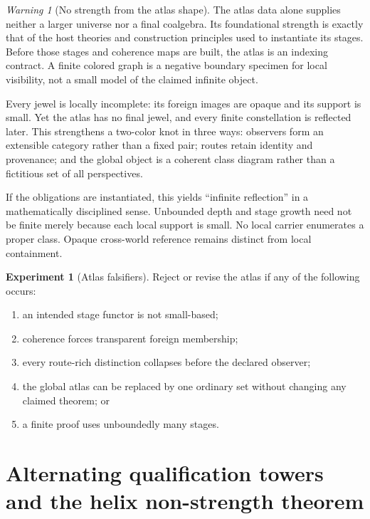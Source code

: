 \documentclass[11pt]{article}
\theoremstyle{definition}
\newtheorem{experiment}[theorem]{Experiment}
\theoremstyle{remark}
\newtheorem{warning}[theorem]{Warning}
\begin{document}
\begin{warning}[No strength from the atlas shape]
The atlas data alone supplies neither a larger universe nor a final coalgebra.
Its foundational strength is exactly that of the host theories and construction
principles used to instantiate its stages.  Before those stages and coherence
maps are built, the atlas is an indexing contract.  A finite colored graph is a
negative boundary specimen for local visibility, not a small model of the
claimed infinite object.
\end{warning}

Every jewel is locally incomplete: its foreign images are opaque and its support
is small.  Yet the atlas has no final jewel, and every finite constellation is
reflected later.  This strengthens a two-color knot in three ways: observers form
an extensible category rather than a fixed pair; routes retain identity and
provenance; and the global object is a coherent class diagram rather than a
fictitious set of all perspectives.

If the obligations are instantiated, this yields ``infinite reflection'' in a
mathematically disciplined sense.  Unbounded depth and stage growth need not be
finite merely because each local support is small.  No local carrier enumerates
a proper class.  Opaque cross-world reference remains distinct from local
containment.

\begin{experiment}[Atlas falsifiers]
Reject or revise the atlas if any of the following occurs:
\begin{enumerate}[label=(\roman*)]
\item an intended stage functor is not small-based;
\item coherence forces transparent foreign membership;
\item every route-rich distinction collapses before the declared observer;
\item the global atlas can be replaced by one ordinary set without changing any
  claimed theorem; or
\item a finite proof uses unboundedly many stages.
\end{enumerate}
\end{experiment}

\section{Alternating qualification towers and the helix non-strength theorem}
\end{document}
